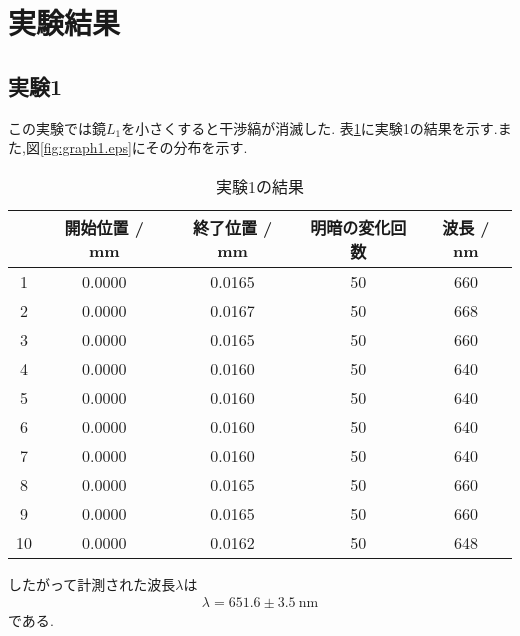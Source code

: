 \section{実験結果}
\subsection{実験1}
\label{sec:res_1}
この実験では鏡$L_1$を小さくすると干渉縞が消滅した.
表\ref{tab:res_1}に実験1の結果を示す.また,図\ref{fig:graph1.eps}にその分布を示す.
\begin{table}[htbp]
   \caption{実験1の結果}
   \label{tab:res_1}
   \centering
   \begin{tabular}{c|cccc}
     \hline
     &開始位置 / \si{\milli\metre}&終了位置 / \si{\milli\metre}&明暗の変化回数&波長 / \si{\nano\metre}\\
     \hline \hline
     1 & 0.0000 & 0.0165 & 50 & 660 \\
2 & 0.0000 & 0.0167 & 50 & 668 \\
3 & 0.0000 & 0.0165 & 50 & 660 \\
4 & 0.0000 & 0.0160 & 50 & 640 \\
5 & 0.0000 & 0.0160 & 50 & 640 \\
6 & 0.0000 & 0.0160 & 50 & 640 \\
7 & 0.0000 & 0.0160 & 50 & 640 \\
8 & 0.0000 & 0.0165 & 50 & 660 \\
9 & 0.0000 & 0.0165 & 50 & 660 \\
10 & 0.0000 & 0.0162 & 50 & 648 \\
     \hline
   \end{tabular}
\end{table}
したがって計測された波長$\lambda$は
\begin{align*}
  \lambda=651.6\pm3.5~\si{\nano\metre}
\end{align*}
である\cite{buturi}.
